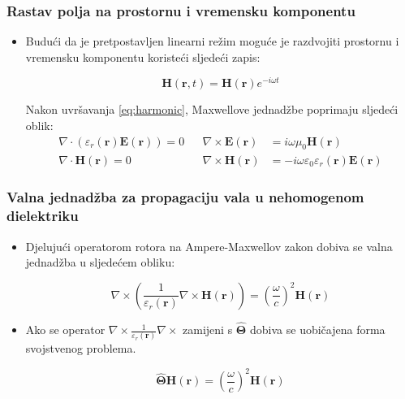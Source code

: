 \documentclass{beamer}
\begin{document}
\begin{frame}
	\frametitle{Rastav polja na prostornu i vremensku komponentu}
	\begin{itemize}
		\item Budući da je pretpostavljen linearni režim moguće je razdvojiti
            prostornu i vremensku komponentu koristeći sljedeći zapis:

		\begin{equation} \label{eq:harmonic}
			\mathbf{H}(\mathbf{r}, t) = \mathbf{H}(\mathbf{r}) e^{-i \omega t}
		\end{equation}

		Nakon uvršavanja \ref{eq:harmonic}, Maxwellove jednadžbe poprimaju
			sljedeći oblik:
		\begin{align*}
			\nabla \cdot (\varepsilon_r(\mathbf{r}) \mathbf{E}(\mathbf{r})) = 0 &&
			\nabla \times \mathbf{E}(\mathbf{r}) &=
				i \omega \mu_0 \mathbf{H}(\mathbf{r})  \nonumber \\
			\nabla \cdot \mathbf{H}(\mathbf{r}) = 0 &&
			\nabla \times \mathbf{H}(\mathbf{r}) &=
				- i \omega \varepsilon_0
				\varepsilon_r(\mathbf{r})\mathbf{E}(\mathbf{r})
		\end{align*}
	\end{itemize}
\end{frame}


\begin{frame}
	\frametitle{Valna jednadžba za propagaciju vala u nehomogenom dielektriku}
	\begin{itemize}
		\item Djelujući operatorom rotora na Ampere-Maxwellov zakon dobiva se
			valna jednadžba u sljedećem obliku:

		\begin{equation} \label{eq:master}
			\nabla \times \left(\frac{1}{\varepsilon_r(\mathbf{r})}\nabla
					\times \mathbf{H}(\mathbf{r}) \right)
			= \left( \frac{\omega}{c} \right)^2 \mathbf{H}(\mathbf{r})
		\end{equation}

		\item Ako se operator
			${\nabla \times \frac{1}{\varepsilon_r(\mathbf{r})} \nabla \times}$
			zamijeni s $\hat{\bm{\Theta}}$ dobiva se uobičajena forma
			svojstvenog problema.

		\begin{equation}
			\hat{\bm{\Theta}} \mathbf{H}(\mathbf{r}) =
				\left( \frac{\omega}{c} \right)^2 \mathbf{H}(\mathbf{r})
		\end{equation}
	\end{itemize}
\end{frame}
\end{document}
